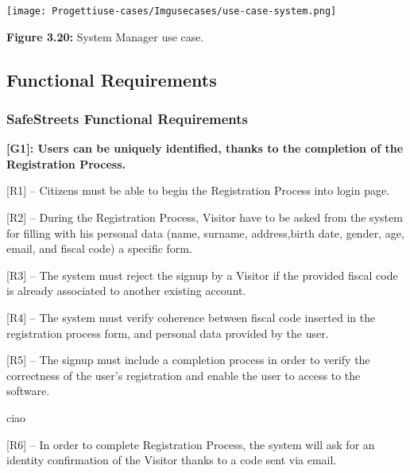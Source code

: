 \documentclass[12pt]{article}
\begin{document}
\begin{center}
\texttt{[image: Progettiuse-cases/Imgusecases/use-case-system.png]}                  

\textbf{Figure 3.20:} System Manager use case. 
\end{center}

\newpage

\subsection{Functional Requirements}
\vspace{5mm}

\subsubsection{SafeStreets Functional Requirements}
\vspace{2mm}%
\textbf{[G1]: Users can be uniquely identified, thanks to the completion of the Registration Process.}
\vspace{2mm}
\begin{flushleft}


[R1] -- Citizens must be able to begin the Registration Process into login page.
\vspace{2mm}

[R2] – During the Registration Process, Visitor have to be asked from the system for filling with his personal data (name, surname, address,birth date, gender, age, email, and fiscal code) a specific form.
\vspace{2mm}

[R3] – The system must reject the signup by a Visitor if the provided fiscal code is already associated to another existing account.
\vspace{2mm}

[R4] – The system must verify coherence between fiscal code inserted in the registration process form, and personal data provided by the user.
\vspace{2mm}

[R5] – The signup must include a completion process in order to verify the correctness of the user’s registration and enable the user to access to the software.
\vspace{2mm}

ciao
\vspace{2mm}

[R6] -- In order to complete Registration Process, the system will ask for an identity confirmation of the Visitor thanks to a code sent via email.
\end{flushleft}
\end{document}
